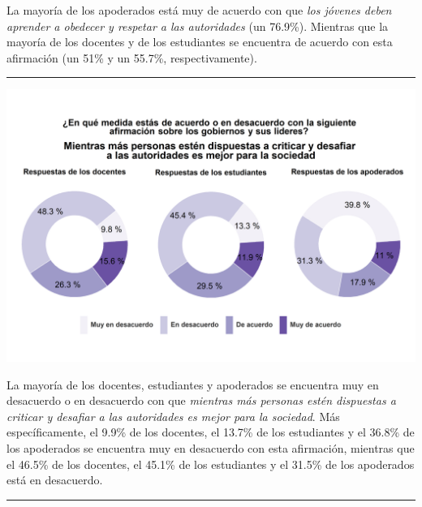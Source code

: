\documentclass[
  14pt,
]{book}
\let\origfigure\figure
\let\endorigfigure\endfigure
\renewenvironment{figure}[1][2] {
  \expandafter\origfigure\expandafter[H]
} {
  \endorigfigure
}
\begin{document}
La mayoría de los apoderados está muy de acuerdo con que \emph{los jóvenes deben aprender a obedecer y respetar a las autoridades} (un 76.9\%). Mientras que la mayoría de los docentes y de los estudiantes se encuentra de acuerdo con esta afirmación (un 51\% y un 55.7\%, respectivamente).

\begin{center}\rule{0.5\linewidth}{0.5pt}\end{center}

\begin{figure}[!ht]

{\centering \includegraphics[width=0.8\linewidth,]{images/graph_aut2} 

}

\caption{Criticar y desafiar a las autoridades es mejor para la sociedad}\label{fig:unnamed-chunk-43}
\end{figure}

La mayoría de los docentes, estudiantes y apoderados se encuentra muy en desacuerdo o en desacuerdo con que \emph{mientras más personas estén dispuestas a criticar y desafiar a las autoridades es mejor para la sociedad}. Más específicamente, el 9.9\% de los docentes, el 13.7\% de los estudiantes y el 36.8\% de los apoderados se encuentra muy en desacuerdo con esta afirmación, mientras que el 46.5\% de los docentes, el 45.1\% de los estudiantes y el 31.5\% de los apoderados está en desacuerdo.

\begin{center}\rule{0.5\linewidth}{0.5pt}\end{center}
\end{document}
